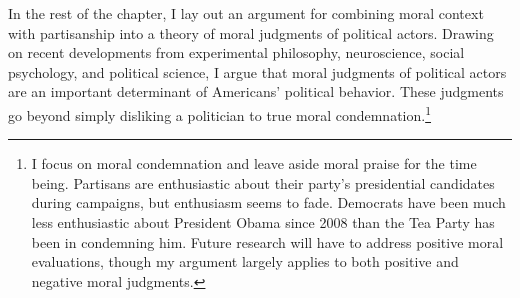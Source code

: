 In the rest of the chapter, I lay out an argument for combining moral context with partisanship into a theory of moral judgments of political actors. Drawing on recent developments from experimental philosophy, neuroscience, social psychology, and political science, I argue that moral judgments of political actors are an important determinant of Americans' political behavior. These judgments go beyond simply disliking a politician to true moral condemnation.\footnote{I focus on moral condemnation and leave aside moral praise for the time being. Partisans are enthusiastic about their party's presidential candidates during campaigns, but enthusiasm seems to fade. Democrats have been much less enthusiastic about President Obama since 2008 than the Tea Party has been in condemning him. Future research will have to address positive moral evaluations, though my argument largely applies to both positive and negative moral judgments.}




